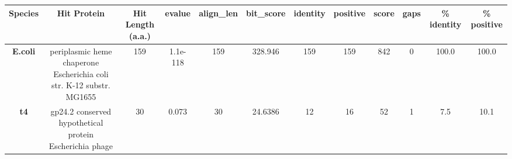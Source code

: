 \begin{tabular}{|c|c|c|c|c|c|c|c|c|c|c|c|} \hline
\textbf{Species} & \textbf{Hit Protein} & \textbf{Hit Length (a.a.)} & \textbf{evalue} & \textbf{align\_len} & \textbf{bit\_score} & \textbf{identity} & \textbf{positive} & \textbf{score} & \textbf{gaps} & \textbf{\% identity} & \textbf{\% positive} \\ \hline
\textbf{E.coli} & periplasmic heme chaperone Escherichia coli str. K-12 substr. MG1655 & 159 & 1.1e-118 & 159 & 328.946 & 159 & 159 & 842 & 0 & 100.0 & 100.0\\
\textbf{t4} & gp24.2 conserved hypothetical protein Escherichia phage  & 30 & 0.073 & 30 & 24.6386 & 12 & 16 & 52 & 1 & 7.5 & 10.1\\
\hline \end{tabular}
